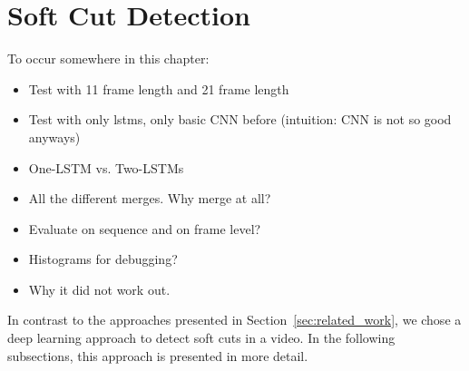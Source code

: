 \FloatBarrier
\section{Soft Cut Detection}
\label{sec:soft_cut}

To occur somewhere in this chapter:
\begin{itemize}
    \item Test with 11 frame length and 21 frame length
    \item Test with only lstms, only basic CNN before (intuition: CNN is not so good anyways)
    \item One-LSTM vs. Two-LSTMs
    \item All the different merges. Why merge at all?
    \item Evaluate on sequence and on frame level?
    \item Histograms for debugging?
    \item Why it did not work out.

\end{itemize}

%
%


In contrast to the approaches presented in Section~\ref{sec:related_work}, we chose a deep learning approach to detect soft cuts in a video.
In the following subsections, this approach is presented in more detail.




